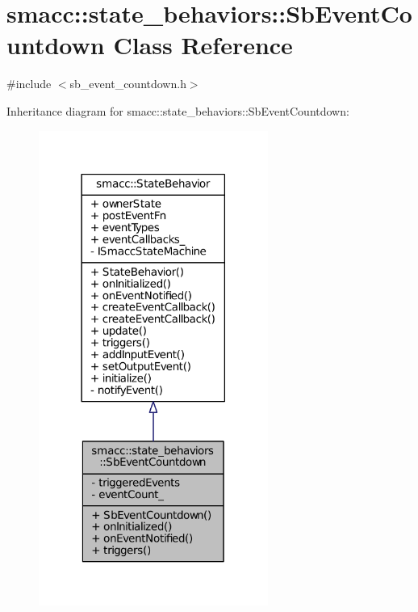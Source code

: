 \hypertarget{classsmacc_1_1state__behaviors_1_1SbEventCountdown}{}\section{smacc\+:\+:state\+\_\+behaviors\+:\+:Sb\+Event\+Countdown Class Reference}
\label{classsmacc_1_1state__behaviors_1_1SbEventCountdown}


{\ttfamily \#include $<$sb\+\_\+event\+\_\+countdown.\+h$>$}



Inheritance diagram for smacc\+:\+:state\+\_\+behaviors\+:\+:Sb\+Event\+Countdown\+:
\nopagebreak
\begin{figure}[H]
\begin{center}
\leavevmode
\includegraphics[width=213pt]{classsmacc_1_1state__behaviors_1_1SbEventCountdown__inherit__graph}
\end{center}
\end{figure}


